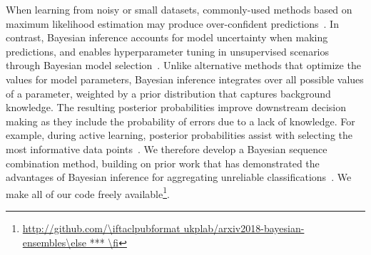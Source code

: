 When learning from noisy or small datasets, commonly-used
methods based on maximum likelihood estimation may produce over-confident predictions~\cite{xiong2011bayesian,srivastava2014dropout}. 
In contrast, Bayesian inference accounts for model uncertainty when making predictions,
and enables hyperparameter tuning in unsupervised scenarios through Bayesian model selection~\cite{Bishop2006}. 
Unlike alternative methods that optimize the values for model parameters, Bayesian inference
integrates over all possible values of a parameter, weighted by a prior distribution that captures background knowledge.
The resulting posterior probabilities improve downstream decision making
as they include the probability of errors due to a lack of knowledge. For example, 
during active learning, posterior probabilities assist with selecting the most informative data points~\cite{settles2010active}.
We therefore develop a Bayesian sequence combination method, building on prior work that has demonstrated the advantages of Bayesian inference for aggregating unreliable classifications~\cite{kim2012bayesian,simpsonlong,Felt2016SemanticAA,paun2018comparing}.
We make 
all of our code freely available\footnote{\url{http://github.com/\iftaclpubformat ukplab/arxiv2018-bayesian-ensembles\else *** \fi}}. 



